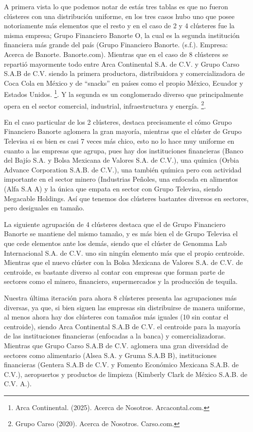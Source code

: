 \documentclass[
]{article}
\begin{document}
A primera vista lo que podemos notar de estás tres tablas es que no fueron clústeres
con una distribución uniforme, en los tres casos hubo uno que posee notoriamente
más elementos que el resto y en el caso de 2 y 4 clústeres fue la misma empresa;
Grupo Financiero Banorte O, la cual es la segunda institución financiera más grande
del país (Grupo Financiero Banorte. (s.f.). Empresa: Acerca de Banorte. Banorte.com).
Mientras que en el caso de 8 clústeres se repartió mayormente todo entre Arca
Continental S.A. de C.V. y Grupo Carso S.A.B de C.V. siendo la primera productora,
distribuidora y comercializadora de Coca Cola en México y de “snacks” en países
como el propio México, Ecuador y Estados Unidos. \footnote{Arca Continental. (2025).
Acerca de Nosotros. Arcacontal.com.}. Y la segunda es un conglomerado diverso
que principalmente opera en el sector comercial, industrial, infraestructura y energía.
\footnote{Grupo Carso (2020). Acerca de Nosotros. Carso.com.}.

En el caso particular de los 2 clústeres, destaca precisamente el cómo Grupo
Financiero Banorte aglomera la gran mayoría, mientras que el clúster de Grupo
Televisa si es bien es casi 7 veces más chico, esto no lo hace muy uniforme en
cuanto a las empresas que agrupa, pues hay dos instituciones financieras (Banco
del Bajío S.A. y Bolsa Mexicana de Valores S.A. de C.V.), una química (Orbia
Advance Corporation S.A.B. de C.V.), una también química pero con actividad
importante en el sector minero (Industrias Peñoles, una enfocada en alimentos (Alfa
S.A A) y la única que empata en sector con Grupo Televisa, siendo Megacable
Holdings. Así que tenemos dos clústeres bastantes diversos en sectores, pero
desiguales en tamaño.

La siguiente agrupación de 4 clústeres destaca que el de Grupo Financiero Banorte
se mantiene del mismo tamaño, y es más bien el de Grupo Televisa el que cede
elementos ante los demás, siendo que el clúster de Genomma Lab Internacional
S.A. de C.V. uno sin ningún elemento más que el propio centroide. Mientras que el
nuevo clúster con la Bolsa Mexicana de Valores S.A. de C.V. de centroide, es
bastante diverso al contar con empresas que forman parte de sectores como el
minero, financiero, supermercados y la producción de tequila.

Nuestra última iteración para ahora 8 clústeres presenta las agrupaciones más
diversas, ya que, si bien siguen las empresas sin distribuirse de manera uniforme,
al menos ahora hay dos clústeres con tamaños más iguales (10 sin contar el
centroide), siendo Arca Continental S.A.B de C.V. el centroide para la mayoría de
las instituciones financieras (enfocadas a la banca) y comercializadoras. Mientras
que Grupo Carso S.A.B de C.V. aglomera una gran diversidad de sectores como
alimentario (Alsea S.A. y Gruma S.A.B B), instituciones financieras (Gentera S.A.B
de C.V. y Fomento Económico Mexicana S.A.B. de C.V.), aeropuertos y productos
de limpieza (Kimberly Clark de México S.A.B. de C.V. A.).
\end{document}
